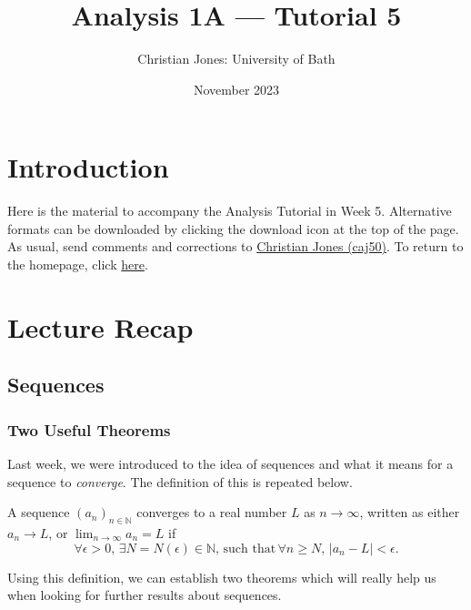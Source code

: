 \documentclass[
  17pt,
  a4paper]{extarticle}
\title{Analysis 1A --- Tutorial 5}
\author{Christian Jones: University of Bath}
\date{November 2023}
\theoremstyle{plain}
\theoremstyle{definition}
\theoremstyle{plain}
\theoremstyle{plain}
\theoremstyle{plain}
\theoremstyle{plain}
\theoremstyle{definition}
\theoremstyle{definition}
\theoremstyle{remark}
\theoremstyle{remark}
\let\BeginKnitrBlock\begin \let\EndKnitrBlock\end
\renewcommand{\;}{\,}
\begin{document}
\maketitle

{
\setcounter{tocdepth}{2}
\tableofcontents
}
\newpage
{}

\hypertarget{introduction}{%
\section*{Introduction}\label{introduction}}

Here is the material to accompany the Analysis Tutorial in Week 5. Alternative formats can be downloaded by clicking the download icon at the top of the page. As usual, send comments and corrections to \href{mailto:caj50@bath.ac.uk}{Christian Jones (caj50)}. To return to the homepage, click \href{http://caj50.github.io/tutoring.html}{here}.

\hypertarget{lecture-recap}{%
\section{Lecture Recap}\label{lecture-recap}}

\hypertarget{sequences}{%
\subsection{Sequences}\label{sequences}}

\hypertarget{two-useful-theorems}{%
\subsubsection{Two Useful Theorems}\label{two-useful-theorems}}

Last week, we were introduced to the idea of sequences and what it means for a sequence to \emph{converge}. The definition of this is repeated below.

\BeginKnitrBlock{definition}[Sequence Convergence]
{\label{def:def1} }A sequence \((a_n)_{n\in\mathbb{N}}\) converges to a real number \(L\) as \(n \longrightarrow \infty\), written as either \(a_n \longrightarrow L\), or \(\lim_{n \to \infty}a_n = L\) if \[\forall \epsilon > 0, \; \exists N = N(\epsilon) \in \mathbb{N}, \; \text{such that} \; \forall n \geq N, \; \lvert a_n - L \rvert < \epsilon.\]
\EndKnitrBlock{definition}

Using this definition, we can establish two theorems which will really help us when looking for further results about sequences.
\end{document}
